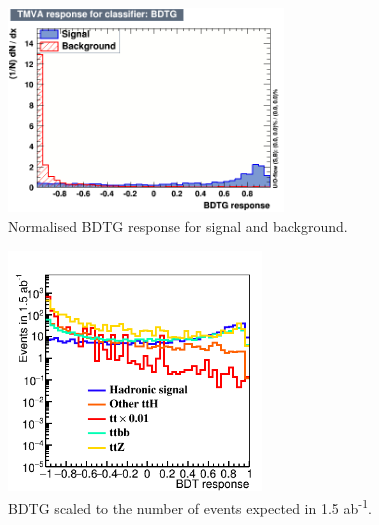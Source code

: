 \begin{figure}[h]
	\centering
	\includegraphics[width=0.65\textwidth]{../Pictures/Analysis/BDTs/mva_BDTG.png}
	\caption{Normalised BDTG response for signal and background.}
	\label{figure:analysis/results/bdt-response}
\end{figure}

\begin{figure}[h]
	\centering
	\includegraphics[width=0.60\textwidth]{../Pictures/Analysis/BDTs/MVA_BDTG_comb_had.png}
	\caption{BDTG scaled to the number of events expected in 1.5 ab\textsuperscript{-1}.}
	\label{figure:analysis/results/bdt-response}
\end{figure}